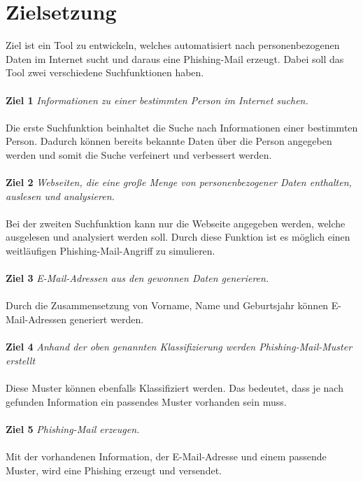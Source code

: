 \section{Zielsetzung}
\label {sec:Zielsetzung}
 Ziel ist ein Tool zu entwickeln, welches automatisiert nach personenbezogenen Daten im Internet sucht und daraus eine Phishing-Mail erzeugt. Dabei soll das Tool zwei verschiedene Suchfunktionen haben. \\\\
 {\bf Ziel 1} \textit{Informationen zu einer bestimmten Person im Internet suchen.}\\\\
 Die erste Suchfunktion beinhaltet die Suche nach Informationen einer bestimmten Person. Dadurch können bereits bekannte Daten über die Person angegeben werden und somit die Suche verfeinert und verbessert werden.\\\\
 {\bf Ziel 2} \textit{Webseiten, die eine große Menge von personenbezogener Daten enthalten, auslesen und analysieren.}\\\\
 Bei der zweiten Suchfunktion kann nur die Webseite angegeben werden, welche ausgelesen und analysiert werden soll. Durch diese Funktion ist es möglich einen weitläufigen Phishing-Mail-Angriff zu simulieren.\\\\
 {\bf Ziel 3} \textit{E-Mail-Adressen aus den gewonnen Daten generieren.}\\\\
 Durch die Zusammensetzung von Vorname, Name und Geburtsjahr können E-Mail-Adressen generiert werden.\\\\
 {\bf Ziel 4} \textit{Anhand der oben genannten Klassifizierung werden Phishing-Mail-Muster erstellt}\\\\
 Diese Muster können ebenfalls Klassifiziert werden. Das bedeutet, dass je nach gefunden Information ein passendes Muster vorhanden sein muss.\\\\
 {\bf Ziel 5} \textit{Phishing-Mail erzeugen.}\\\\
 Mit der vorhandenen Information, der E-Mail-Adresse und einem passende Muster, wird eine Phishing erzeugt und versendet.
 


